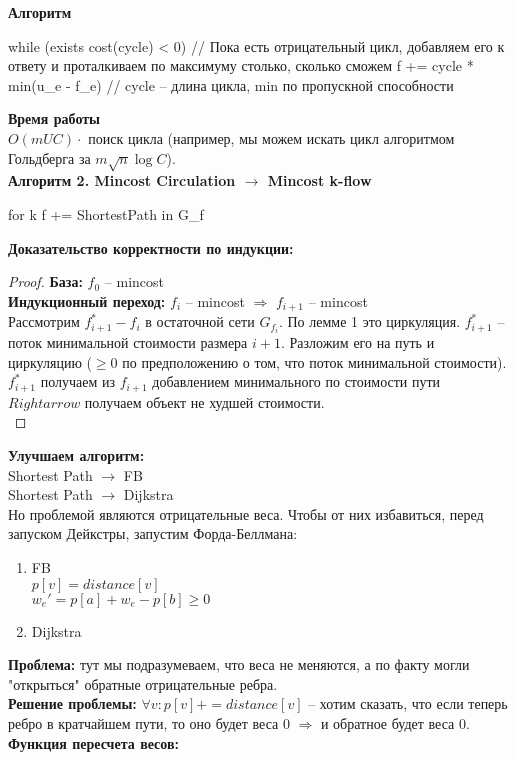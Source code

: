 {\bfseries Алгоритм}\\

\begin{cppcode}
	while (exists cost(cycle) < 0) // Пока есть отрицательный цикл, добавляем его к ответу и проталкиваем по максимуму столько, сколько сможем 
		f += cycle * min(u_e - f_e) // cycle -- длина цикла, min по пропускной способности
\end{cppcode}

{\bfseries Время работы}\\
$O(mUC)\cdot$ поиск цикла (например, мы можем искать цикл алгоритмом Гольдберга за $m\sqrt n \log C$).\\

{\bfseries Алгоритм 2. Mincost Circulation $\to$ Mincost k-flow}
\begin{cppcode}
	for k
		f += ShortestPath in G_f	
\end{cppcode}

{\bfseries Доказательство корректности по индукции:}\\
\begin{proof}
{\bfseries База:} $f_0$ -- mincost\\
{\bfseries Индукционный переход:} $f_i$ -- mincost $\Rightarrow$ $f_{i+1}$ -- mincost\\
Рассмотрим $f^*_{i+1} - f_i$ в остаточной сети $G_{f_i}$. По лемме 1 это циркуляция. $f^*_{i + 1}$ -- поток минимальной стоимости размера $i + 1$. Разложим его на путь и циркуляцию ($\ge 0$ по предположению о
том, что поток минимальной стоимости). $f^*_{i+1}$ получаем из $f_{i+1}$ добавлением минимального по стоимости пути $Rightarrow$ получаем объект не худшей стоимости.\\
\end{proof}
{\bfseries Улучшаем алгоритм:}\\
Shortest Path $\to$ FB \\
Shortest Path $\to$ Dijkstra \\

Но проблемой являются отрицательные веса. Чтобы от них избавиться, перед запуском Дейкстры, запустим Форда-Беллмана:
\begin{enumerate}
	\item FB\\
		 $p[v] = distance[v]$\\
		 $w_e' = p[a] + w_e - p[b] \ge 0$
	\item Dijkstra
\end{enumerate}
{\bfseries Проблема:} тут мы подразумеваем, что веса не меняются, а по факту могли "открыться" обратные отрицательные ребра.\\
{\bfseries Решение проблемы:} $\forall v: p[v] += distance[v]$ -- хотим сказать, что если теперь ребро в кратчайшем пути, то оно будет веса 0 $\Rightarrow$ и обратное будет веса 0.\\
{\bfseries Функция пересчета весов:}
\begin{cppcode}
	Apply(w, p) {
		for w_e = ...    // Пересчитываем вес ребра с учетом потенциалов
	Apply(w, distance)   // Наш потенциал - расстояние
\end{cppcode}

